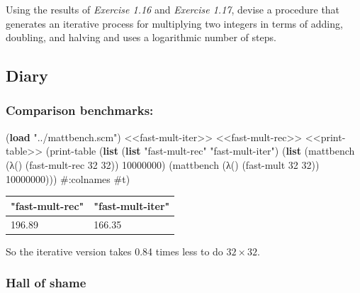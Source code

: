 \documentclass[
]{article}
\newenvironment{Shaded}{}{}
\newcommand{\DecValTok}[1]{\textcolor[rgb]{0.25,0.63,0.44}{#1}}
\newcommand{\KeywordTok}[1]{\textcolor[rgb]{0.00,0.44,0.13}{\textbf{#1}}}
\newcommand{\NormalTok}[1]{#1}
\newcommand{\StringTok}[1]{\textcolor[rgb]{0.25,0.44,0.63}{#1}}
\begin{document}
Using the results of {\emph{Exercise 1.16}} and {\emph{Exercise 1.17}},
devise a procedure that generates an iterative process for multiplying
two integers in terms of adding, doubling, and halving and uses a
logarithmic number of steps.

\hypertarget{diary-3}{%
\subsection{Diary}\label{diary-3}}

\hypertarget{comparison-benchmarks}{%
\subsubsection{Comparison benchmarks:}\label{comparison-benchmarks}}

\begin{Shaded}
\begin{Highlighting}[numbers=left,,]
\NormalTok{(}\KeywordTok{load} \StringTok{"../mattbench.scm"}\NormalTok{)}
\NormalTok{\textless{}\textless{}fast{-}mult{-}iter\textgreater{}\textgreater{}}
\NormalTok{\textless{}\textless{}fast{-}mult{-}rec\textgreater{}\textgreater{}}
\NormalTok{\textless{}\textless{}print{-}table\textgreater{}\textgreater{}}
\NormalTok{(print{-}table (}\KeywordTok{list}\NormalTok{ (}\KeywordTok{list} \StringTok{"fast{-}mult{-}rec"} \StringTok{"fast{-}mult{-}iter"}\NormalTok{)}
\NormalTok{                   (}\KeywordTok{list}\NormalTok{ (mattbench (λ() (fast{-}mult{-}rec }\DecValTok{32} \DecValTok{32}\NormalTok{)) }\DecValTok{10000000}\NormalTok{)}
\NormalTok{                         (mattbench (λ() (fast{-}mult }\DecValTok{32} \DecValTok{32}\NormalTok{)) }\DecValTok{10000000}\NormalTok{)))}
\NormalTok{             \#:colnames }\DecValTok{\#t}\NormalTok{)}
\end{Highlighting}
\end{Shaded}

\begin{longtable}[]{@{}ll@{}}
\toprule
"fast-mult-rec" & "fast-mult-iter" \\
\midrule
\endhead
196.89 & 166.35 \\
\bottomrule
\end{longtable}

So the iterative version takes 0.84 times less to do \(32 \times 32\).

\hypertarget{hall-of-shame}{%
\subsubsection{Hall of shame}\label{hall-of-shame}}
\end{document}
